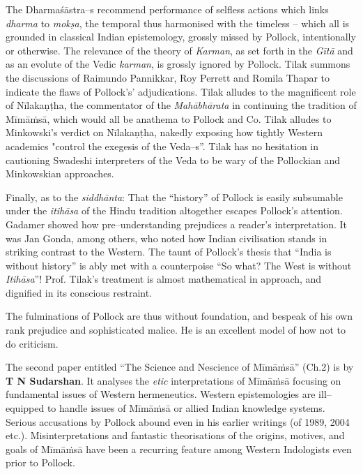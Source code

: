The Dharmaśāstra–s recommend performance of selfless actions which links \textit{dharma} to \textit{mokṣa}, the temporal thus harmonised with the timeless – which all is grounded in classical Indian epistemology, grossly missed by Pollock, intentionally or otherwise. The relevance of the theory of \textit{Karman}, as set forth in the \textit{Gītā} and as an evolute of the Vedic \textit{karman}, is grossly ignored by Pollock. Tilak summons the discussions of Raimundo Pannikkar, Roy Perrett and Romila Thapar to indicate the flaws of Pollock’s’ adjudications. Tilak alludes to the magnificent role of Nīlakaṇṭha, the commentator of the \textit{Mahābhārata} in continuing the tradition of Mīmāṁsā, which would all be anathema to Pollock and Co. Tilak alludes to Minkowski’s verdict on Nīlakaṇṭha, nakedly exposing how tightly Western academics "control the exegesis of the Veda–s”. Tilak has no hesitation in cautioning Swadeshi interpreters of the Veda to be wary of the Pollockian and Minkowskian approaches.

Finally, as to the \textit{siddhānta}: That the “history” of Pollock is easily subsumable under the \textit{itihāsa} of the Hindu tradition altogether escapes Pollock's attention. Gadamer showed how pre–understanding prejudices a reader’s interpretation. It was Jan Gonda, among others, who noted how Indian civilisation stands in striking contrast to the Western. The taunt of Pollock’s thesis that “India is without history” is ably met with a counterpoise “So what? The West is without \textit{Itihāsa}”! Prof. Tilak’s treatment is almost mathematical in approach, and dignified in its conscious restraint. 

The fulminations of Pollock are thus without foundation, and bespeak of his own rank prejudice and sophisticated malice. He is an excellent model of how not to do criticism.

The second paper entitled “The Science and Nescience of Mīmāṁsā” (Ch.2) is by \textbf{T N Sudarshan}. It analyses the \textit{etic} interpretations of Mīmāṁsā focusing on fundamental issues of Western hermeneutics. Western epistemologies are ill–equipped to handle issues of Mīmāṁsā or allied Indian knowledge systems. Serious accusations by Pollock abound even in his earlier writings (of 1989, 2004 etc.). Misinterpretations and fantastic theorisations of the origins, motives, and goals of Mīmāṁsā have been a recurring feature among Western Indologists even prior to Pollock. 

